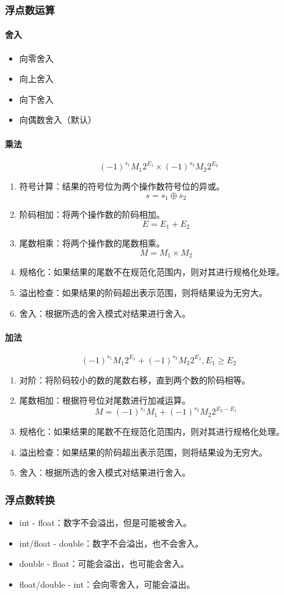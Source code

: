 \subsubsection{浮点数运算}
\paragraph{舍入}
\begin{itemize}
    \item 向零舍入
    \item 向上舍入
    \item 向下舍入
    \item 向偶数舍入（默认）
\end{itemize}

\paragraph{乘法}
$$ (-1)^{s_1}M_1 2^{E_1} \times (-1)^{s_2}M_2 2^{E_2} $$
\begin{enumerate}
    \item 符号计算：结果的符号位为两个操作数符号位的异或。
          $$s = s_1 \oplus s_2$$
    \item 阶码相加：将两个操作数的阶码相加。
          $$E = E_1 + E_2$$
    \item 尾数相乘：将两个操作数的尾数相乘。
          $$M = M_1 \times M_2$$
    \item 规格化：如果结果的尾数不在规范化范围内，则对其进行规格化处理。
    \item 溢出检查：如果结果的阶码超出表示范围，则将结果设为无穷大。
    \item 舍入：根据所选的舍入模式对结果进行舍入。
\end{enumerate}

\paragraph{加法}
$$ (-1)^{s_1}M_1 2^{E_1} + (-1)^{s_2}M_2 2^{E_2}, E_1 \geq E_2$$
\begin{enumerate}
    \item 对阶：将阶码较小的数的尾数右移，直到两个数的阶码相等。
    \item 尾数相加：根据符号位对尾数进行加减运算。
          $$M = (-1)^{s_1} M_1 + (-1)^{s_2} M_2 2^{E_2 - E_1}$$
    \item 规格化：如果结果的尾数不在规范化范围内，则对其进行规格化处理。
    \item 溢出检查：如果结果的阶码超出表示范围，则将结果设为无穷大。
    \item 舍入：根据所选的舍入模式对结果进行舍入。
\end{enumerate}

\subsubsection{浮点数转换}
\begin{itemize}
    \item int - float：数字不会溢出，但是可能被舍入。
    \item int/float - double：数字不会溢出，也不会舍入。
    \item double - float：可能会溢出，也可能会舍入。
    \item float/double - int：会向零舍入，可能会溢出。
\end{itemize}

\newpage